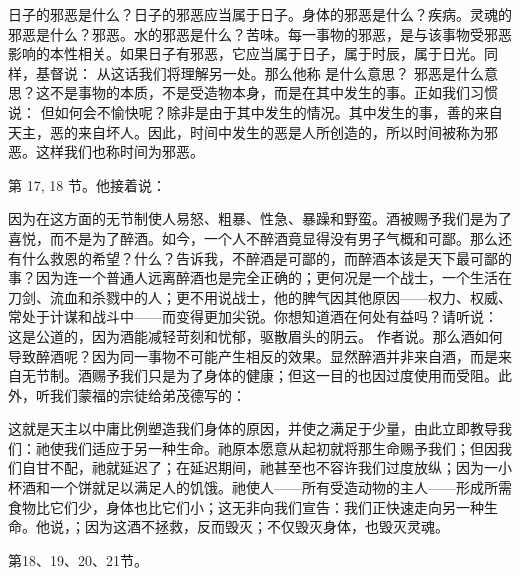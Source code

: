 \par

日子的邪恶是什么？日子的邪恶应当属于日子。身体的邪恶是什么？疾病。灵魂的邪恶是什么？邪恶。水的邪恶是什么？苦味。每一事物的邪恶，是与该事物受邪恶影响的本性相关。如果日子有邪恶，它应当属于日子，属于时辰，属于日光。同样，基督说：  从这话我们将理解另一处。那么他称  是什么意思？ 邪恶是什么意思？这不是事物的本质，不是受造物本身，而是在其中发生的事。正如我们习惯说： 但如何会不愉快呢？除非是由于其中发生的情况。其中发生的事，善的来自天主，恶的来自坏人。因此，时间中发生的恶是人所创造的，所以时间被称为邪恶。这样我们也称时间为邪恶。\par

第 17, 18 节。他接着说：\par

因为在这方面的无节制使人易怒、粗暴、性急、暴躁和野蛮。酒被赐予我们是为了喜悦，而不是为了醉酒。如今，一个人不醉酒竟显得没有男子气概和可鄙。那么还有什么救恩的希望？什么？告诉我，不醉酒是可鄙的，而醉酒本该是天下最可鄙的事？因为连一个普通人远离醉酒也是完全正确的；更何况是一个战士，一个生活在刀剑、流血和杀戮中的人；更不用说战士，他的脾气因其他原因——权力、权威、常处于计谋和战斗中——而变得更加尖锐。你想知道酒在何处有益吗？请听说：  这是公道的，因为酒能减轻苛刻和忧郁，驱散眉头的阴云。  作者说。那么酒如何导致醉酒呢？因为同一事物不可能产生相反的效果。显然醉酒并非来自酒，而是来自无节制。酒赐予我们只是为了身体的健康；但这一目的也因过度使用而受阻。此外，听我们蒙福的宗徒给弟茂德写的： \par

这就是天主以中庸比例塑造我们身体的原因，并使之满足于少量，由此立即教导我们：祂使我们适应于另一种生命。祂原本愿意从起初就将那生命赐予我们；但因我们自甘不配，祂就延迟了；在延迟期间，祂甚至也不容许我们过度放纵；因为一小杯酒和一个饼就足以满足人的饥饿。祂使人——所有受造动物的主人——形成所需食物比它们少，身体也比它们小；这无非向我们宣告：我们正快速走向另一种生命。他说，；因为这酒不拯救，反而毁灭；不仅毁灭身体，也毁灭灵魂。\par

第18、19、20、21节。\par

